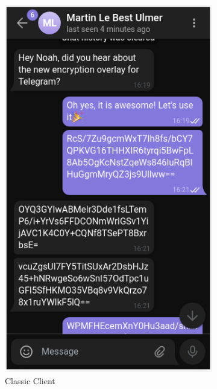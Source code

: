 \documentclass[a4paper, oneside]{discothesis}
\begin{document}
\begin{figure}[h]
\begin{subfigure}{.5\textwidth}
  \includegraphics[width=.8\linewidth]{figures/chat_plain.png}
  \caption{Classic Client}
  \label{fig:chat_plain}
\end{subfigure}%
\begin{subfigure}{.5\textwidth}
  \centering

\end{subfigure}
\end{figure}
\end{document}
